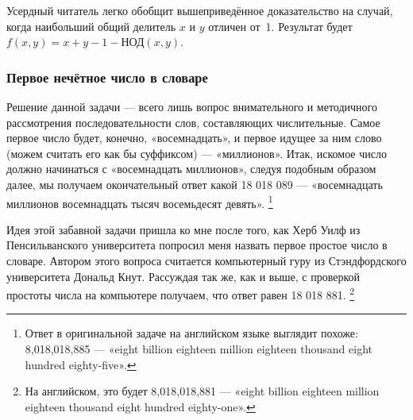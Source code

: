 Усердный читатель легко обобщит вышеприведённое доказательство на случай, 
когда наибольший общий делитель $x$ и $y$ отличен от~1.
Результат будет $f(x,y)=x+y-1-\text{НОД}(x,y)$.

\subsubsection*{Первое нечётное число в словаре}%

Решение данной задачи --- всего лишь вопрос внимательного и методичного рассмотрения последовательности слов, составляющих числительные.
Самое первое число будет, конечно, «восемнадцать», и первое идущее за ним слово (можем считать его как бы суффиксом) --- «миллионов».
Итак, искомое число должно начинаться с «восемнадцать миллионов», следуя подобным образом далее, мы получаем окончательный ответ какой 18 018 089 --- «восемнадцать миллионов восемнадцать тысяч восемьдесят девять».%
\footnote{Ответ в оригинальной задаче на английском языке выглядит похоже: 8,018,018,885 --- «eight billion eighteen million eighteen thousand eight hundred eighty-five».}
\heart

Идея этой забавной задачи пришла ко мне после того, как Херб Уилф из Пенсильванского университета %
попросил меня назвать первое простое число в словаре.
Автором этого вопроса считается компьютерный гуру из Стэндфордского университета Дональд Кнут. %
Рассуждая так же, как и выше, с проверкой простоты числа на компьютере
получаем, что ответ равен 18 018 881.%
\footnote{На английском, это будет 8,018,018,881 --- «eight billion eighteen million eighteen thousand eight hundred eighty-one».}


